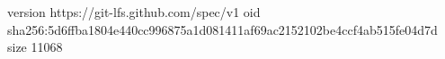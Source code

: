 version https://git-lfs.github.com/spec/v1
oid sha256:5d6ffba1804e440cc996875a1d081411af69ac2152102be4ccf4ab515fe04d7d
size 11068
